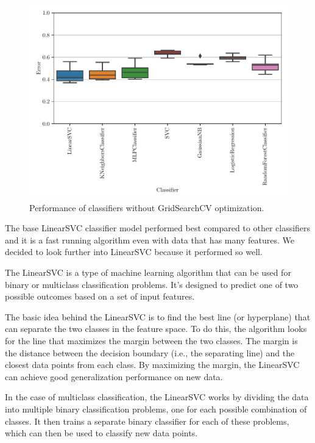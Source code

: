 \begin{figure}[ht]
  \centering
  \includegraphics[width=\scale\textwidth]{../img/plot_explore_classifiers.pdf}
  \caption{Performance of classifiers without GridSearchCV optimization.}
  \label{fig:explore_classifiers}
\end{figure} 

The base LinearSVC classifier model performed best compared to other classifiers and it is a fast running algorithm even with data that has many features. We decided to look further into LinearSVC because it performed so well. 

The LinearSVC is a type of machine learning algorithm that can be used for binary or multiclass classification problems. It's designed to predict one of two possible outcomes based on a set of input features. 

The basic idea behind the LinearSVC is to find the best line (or hyperplane) that can separate the two classes in the feature space. To do this, the algorithm looks for the line that maximizes the margin between the two classes. The margin is the distance between the decision boundary (i.e., the separating line) and the closest data points from each class. By maximizing the margin, the LinearSVC can achieve good generalization performance on new data.

In the case of multiclass classification, the LinearSVC works by dividing the data into multiple binary classification problems, one for each possible combination of classes. It then trains a separate binary classifier for each of these problems, which can then be used to classify new data points.

